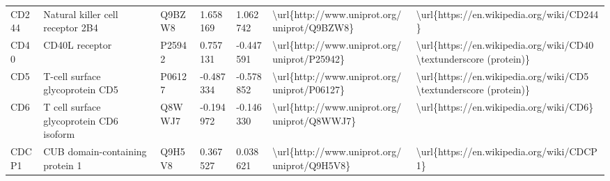 \begin{table}[]
\begin{tabular}{lllllll}
\multicolumn{1}{l|}{CD244}    & Natural killer cell receptor 2B4                              & Q9BZW8  & 1.658169           & 1.062742          & \textbackslash{}url\{http://www.uniprot.org/uniprot/Q9BZW8\} & \textbackslash{}url\{https://en.wikipedia.org/wiki/CD244\}                                                                                                                                                                                                                                         \\
\multicolumn{1}{l|}{CD40}     & CD40L receptor                                                & P25942  & 0.757131           & -0.447591         & \textbackslash{}url\{http://www.uniprot.org/uniprot/P25942\} & \textbackslash{}url\{https://en.wikipedia.org/wiki/CD40 \textbackslash{}textunderscore (protein)\}                                                                                                                                                                                                 \\
\multicolumn{1}{l|}{CD5}      & T-cell surface glycoprotein CD5                               & P06127  & -0.487334          & -0.578852         & \textbackslash{}url\{http://www.uniprot.org/uniprot/P06127\} & \textbackslash{}url\{https://en.wikipedia.org/wiki/CD5 \textbackslash{}textunderscore (protein)\}                                                                                                                                                                                                  \\
\multicolumn{1}{l|}{CD6}      & T cell surface glycoprotein CD6 isoform                       & Q8WWJ7  & -0.194972          & -0.146330         & \textbackslash{}url\{http://www.uniprot.org/uniprot/Q8WWJ7\} & \textbackslash{}url\{https://en.wikipedia.org/wiki/CD6\}                                                                                                                                                                                                                                           \\
\multicolumn{1}{l|}{CDCP1}    & CUB domain-containing protein 1                               & Q9H5V8  & 0.367527           & 0.038621          & \textbackslash{}url\{http://www.uniprot.org/uniprot/Q9H5V8\} & \textbackslash{}url\{https://en.wikipedia.org/wiki/CDCP1\}                                                                                                                                                                                                                                         \\

\end{tabular}
\end{table}
